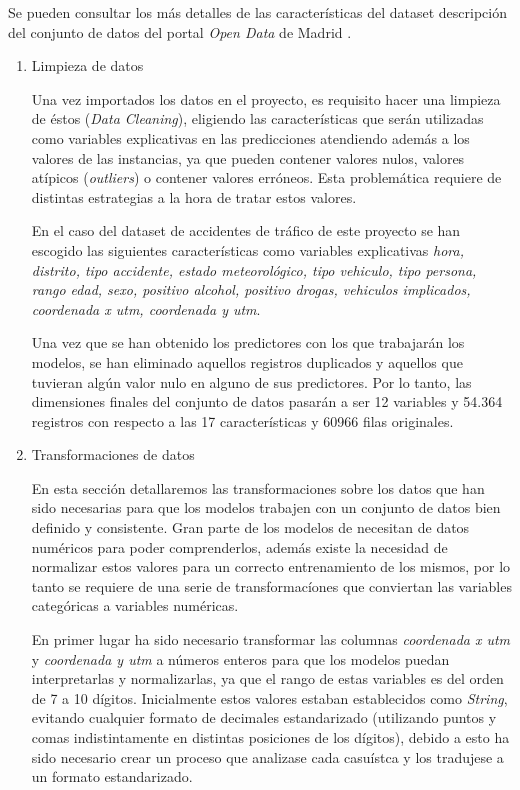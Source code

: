             Se pueden consultar los más detalles de las características del dataset descripción del conjunto de datos del portal \textit{Open Data} de Madrid \cite{InfoDatasetMadrid}.


            \begin{enumerate}

                \item Limpieza de datos

                    Una vez importados los datos en el proyecto, es requisito hacer una limpieza de éstos (\textit{Data Cleaning}), eligiendo las características que serán utilizadas como variables explicativas en las predicciones atendiendo además a los valores de las instancias, ya que pueden contener valores nulos, valores atípicos (\textit{outliers}) o contener valores erróneos. Esta problemática requiere de distintas estrategias a la hora de tratar estos valores.

                    En el caso del dataset de accidentes de tráfico de este proyecto se han escogido las siguientes características como variables explicativas \textit{hora, distrito, tipo accidente, estado meteorológico, tipo vehiculo, tipo persona, rango edad, sexo, positivo alcohol, positivo drogas, vehiculos implicados, coordenada x utm, coordenada y utm}.


                    Una vez que se han obtenido los predictores con los que trabajarán los modelos, se han eliminado aquellos registros duplicados y aquellos que tuvieran algún valor nulo en alguno de sus predictores. Por lo tanto, las dimensiones finales del conjunto de datos pasarán a ser 12 variables y 54.364 registros con respecto a las 17 características y 60966 filas originales. 

                \item Transformaciones de datos

                    En esta sección detallaremos las transformaciones sobre los datos que han sido necesarias para que los modelos trabajen con un conjunto de datos bien definido y consistente. Gran parte de los modelos de  necesitan de datos numéricos para poder comprenderlos, además existe la necesidad de normalizar estos valores para un correcto entrenamiento de los mismos, por lo tanto se requiere de una serie de transformacíones que conviertan las variables categóricas a variables numéricas.

                    En primer lugar ha sido necesario transformar las columnas \textit{coordenada x utm} y \textit{coordenada y utm} a números enteros para que los modelos puedan interpretarlas y normalizarlas, ya que el rango de estas variables es del orden de 7 a 10 dígitos. Inicialmente estos valores estaban establecidos como \textit{String}, evitando cualquier formato de decimales estandarizado (utilizando puntos y comas indistintamente en distintas posiciones de los dígitos), debido a esto ha sido necesario crear un proceso que analizase cada casuístca y los tradujese a un formato estandarizado.


\end{enumerate}
